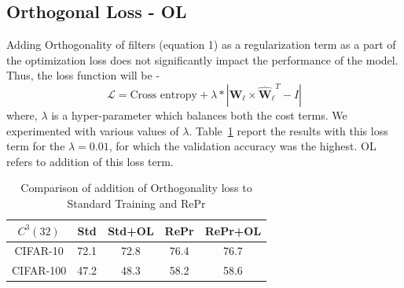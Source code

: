 \subsection{Orthogonal Loss - OL}
Adding Orthogonality of filters (equation 1) as a regularization term as a part of the optimization loss does not significantly impact the performance of the model.
Thus, the loss function will be -
\begin{equation*}
    \mathcal{L} = \text{Cross entropy} + \lambda * |\boldsymbol{\hat{W}_\ell} \times \boldsymbol{\hat{W}_\ell}^T - I |
\end{equation*}
where, $\lambda$ is a hyper-parameter which balances both the cost terms. We experimented with various values of $\lambda$. Table~\ref{tbl:ortho_loss} report the results with this loss term for the $\lambda = 0.01$, for which the validation accuracy was the highest. OL refers to addition of this loss term.

\begin{table}[H]
\center
{}
\begin{tabular}{ccccc}
\toprule
          $C^3(32)$ & \multicolumn{1}{c}{\textbf{Std}} & \multicolumn{1}{c}{\textbf{Std+OL}} & \multicolumn{1}{c}{\textbf{RePr}} & \multicolumn{1}{c}{\textbf{RePr+OL}} \\ \hline
CIFAR-10  & 72.1                                                     & 72.8                                                    & 76.4                                                      & {\color[HTML]{3166FF} 76.7}                                                         \\
CIFAR-100 & 47.2                                                     & 48.3                                                    & 58.2                                                      & {\color[HTML]{3166FF} 58.6}                                                        \\ \bottomrule
\end{tabular}
\caption{Comparison of addition of Orthogonality loss to Standard Training and RePr}
\label{tbl:ortho_loss}
\end{table}


